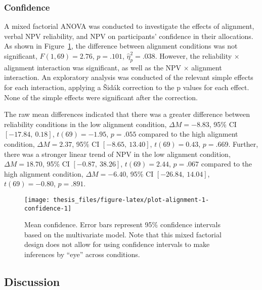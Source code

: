 \documentclass[a4paper, nobind]{templates/ociamthesis}
\theoremstyle{definition}
\theoremstyle{definition}
\theoremstyle{definition}
\theoremstyle{definition}
\theoremstyle{remark}
\begin{document}
\subsubsection{Confidence}

A mixed factorial ANOVA was conducted to investigate the effects of alignment,
verbal NPV reliability, and NPV on participants' confidence in their
allocations. As shown in Figure~\ref{fig:plot-alignment-1-confidence}, the
difference between alignment conditions was not significant,
\(F(1, 69) = 2.76\), \(p = .101\), \(\hat{\eta}^2_p = .038\). However, the reliability \(\times\)
alignment interaction was significant, as well as the NPV \(\times\)
alignment interaction. An exploratory analysis was conducted of the relevant
simple effects for each interaction, applying a Šidák correction to the p values
for each effect. None of the simple effects were significant after the
correction.

The raw mean differences indicated that there was a greater difference between
reliability conditions in the low alignment condition,
\(\Delta M = -8.83\), 95\% CI \([-17.84,~0.18]\), \(t(69) = -1.95\), \(p = .055\) compared to the high alignment
condition, \(\Delta M = 2.37\), 95\% CI \([-8.65,~13.40]\), \(t(69) = 0.43\), \(p = .669\). Further, there was
a stronger linear trend of NPV in the low alignment condition,
\(\Delta M = 18.70\), 95\% CI \([-0.87,~38.26]\), \(t(69) = 2.44\), \(p = .067\) compared to the high alignment
condition, \(\Delta M = -6.40\), 95\% CI \([-26.84,~14.04]\), \(t(69) = -0.80\), \(p = .891\).



\begin{figure}
\texttt{[image: thesis\_files/figure-latex/plot-alignment-1-confidence-1]} \caption{Mean confidence. Error bars represent 95\% confidence intervals based on the multivariate model. Note that this mixed factorial design does not allow for using confidence intervals to make inferences by ``eye'' across conditions.}\label{fig:plot-alignment-1-confidence}
\end{figure}

\subsection{Discussion}
\end{document}
